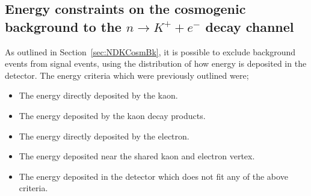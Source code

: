 \subsection{Energy constraints on the cosmogenic background to the $n \rightarrow K^{+} + e^{-}$ decay channel} \label{sec:NDKEnCosmBk}
As outlined in Section~\ref{sec:NDKCosmBk}, it is possible to exclude background events from signal events, using the distribution of how energy is deposited in the detector. The energy criteria which were previously outlined were;
\begin{itemize}
\item The energy directly deposited by the kaon.
\item The energy deposited by the kaon decay products.
\item The energy directly deposited by the electron.
\item The energy deposited near the shared kaon and electron vertex.
\item The energy deposited in the detector which does not fit any of the above criteria.
\end{itemize}
